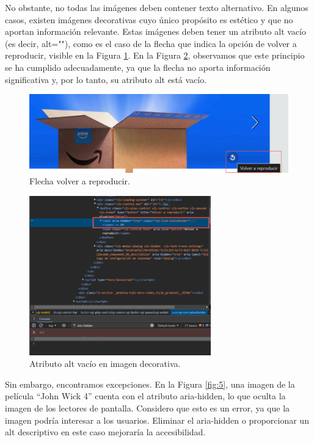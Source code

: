 \documentclass[letterpaper, 12pt]{report}
\begin{document}
No obstante, no todas las imágenes deben contener texto alternativo. En algunos casos, existen imágenes decorativas cuyo único propósito es estético y que no aportan información relevante. Estas imágenes deben tener un atributo alt vacío (es decir, alt=""), como es el caso de la flecha que indica la opción de volver a reproducir, visible en la Figura \ref{fig:3}. En la Figura \ref{fig:4}, observamos que este principio se ha cumplido adecuadamente, ya que la flecha no aporta información significativa y, por lo tanto, su atributo alt está vacío.

\begin{figure}[H]
\centering
\includegraphics[width=1\textwidth]{figure3.png}
\caption{Flecha volver a reproducir.}
\label{fig:3}
\end{figure}

\begin{figure}[H]
\centering
\includegraphics[width=0.7\textwidth]{figure4.png}
\caption{Atributo alt vacío en imagen decorativa.}
\label{fig:4}
\end{figure}

Sin embargo, encontramos excepciones. En la Figura \ref{fig:5}, una imagen de la película ``John Wick 4'' cuenta con el atributo aria-hidden, lo que oculta la imagen de los lectores de pantalla. Considero que esto es un error, ya que la imagen podría interesar a los usuarios. Eliminar el aria-hidden o proporcionar un alt descriptivo en este caso mejoraría la accesibilidad.
\end{document}
